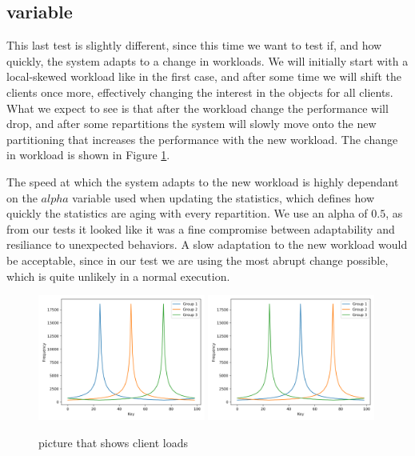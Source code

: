 \subsection{variable}\label{sec:variable}
This last test is slightly different, since this time we want to test if, and how quickly, the system adapts to a change in workloads. We will initially start with a local-skewed workload like in the first case, and after some time we will shift the clients once more, effectively changing the interest in the objects for all clients. What we expect to see is that after the workload change the performance will drop, and after some repartitions the system will slowly move onto the new partitioning that increases the performance with the new workload. The change in workload is shown in Figure \ref{fig:variable-loads}.

The speed at which the system adapts to the new workload is highly dependant on the $alpha$ variable used when updating the statistics, which defines how quickly the statistics are aging with every repartition. We use an alpha of $0.5$, as from our tests it looked like it was a fine compromise between adaptability and resiliance to unexpected behaviors. A slow adaptation to the new workload would be acceptable, since in our test we are using the most abrupt change possible, which is quite unlikely in a normal execution.

\begin{figure}[!htb]
  \centering
  \includegraphics[width=0.49\textwidth,height=\textheight,keepaspectratio]{img/clients_loads.png}
  \includegraphics[width=0.49\textwidth,height=\textheight,keepaspectratio]{img/clients_loads_variable.png}
  \caption[caption]{ picture that shows client loads }
  \label{fig:variable-loads}
\end{figure}

